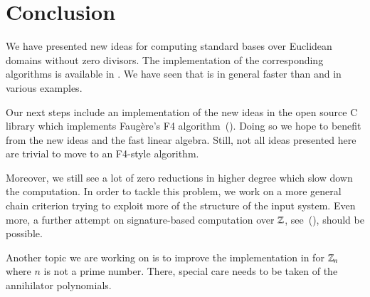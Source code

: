 \section{Conclusion}
We have presented new ideas for computing standard bases over Euclidean domains
without zero divisors.
The implementation of the corresponding algorithms is available in \singular. We
have seen that \singular is in general faster than \macaulay and \magma in
various examples.

Our next steps include an implementation of the new ideas in the open source C library
\gbl which implements Faug\`ere's F4 algorithm~(\cite{gbl}). Doing so we hope to
benefit from the new ideas and the fast linear algebra. Still, not all ideas
presented here are trivial to move to an F4-style algorithm.

Moreover, we still see a lot of zero reductions in higher degree which slow down
the computation. In order to tackle this problem, we work on a more general chain
criterion trying to exploit more of the structure of the input system. Even
more, a further attempt on signature-based computation over $\mathbb{Z}$,
see~(\cite{eppSigZ2017}), should be possible.

Another topic we are working on is to improve the implementation in \singular
for $\mathbb{Z}_n$ where $n$ is not a prime number. There, special care needs to be
taken of the annihilator polynomials.
